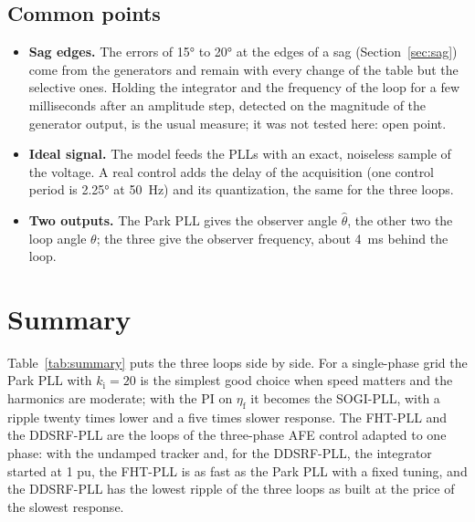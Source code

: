 \documentclass[11pt,a4paper]{scrartcl}
\newcommand{\ped}[1]{_{\mathrm{#1}}}
\begin{document}
\begin{onehalfspace}
\subsection{Common points}
\label{sec:critcommon}

\begin{itemize}[nosep]
	\item \textbf{Sag edges.} The errors of \ang{15} to \ang{20} at the edges of a sag (Section~\ref{sec:sag}) come from the generators and remain with every change of the table but the selective ones. Holding the integrator and the frequency of the loop for a few milliseconds after an amplitude step, detected on the magnitude of the generator output, is the usual measure; it was not tested here: open point.
	\item \textbf{Ideal signal.} The model feeds the PLLs with an exact, noiseless sample of the voltage. A real control adds the delay of the acquisition (one control period is \ang{2.25} at \SI{50}{\hertz}) and its quantization, the same for the three loops.
	\item \textbf{Two outputs.} The Park PLL gives the observer angle $\hat\theta$, the other two the loop angle $\theta$; the three give the observer frequency, about \SI{4}{\milli\second} behind the loop.
\end{itemize}

\section{Summary}
\label{sec:summary}

Table~\ref{tab:summary} puts the three loops side by side. For a single-phase grid the Park PLL with $k\ped{i} = 20$ is the simplest good choice when speed matters and the harmonics are moderate; with the PI on $\eta\ped{f}$ it becomes the SOGI-PLL, with a ripple twenty times lower and a five times slower response. The FHT-PLL and the DDSRF-PLL are the loops of the three-phase AFE control adapted to one phase: with the undamped tracker and, for the DDSRF-PLL, the integrator started at \num{1} pu, the FHT-PLL is as fast as the Park PLL with a fixed tuning, and the DDSRF-PLL has the lowest ripple of the three loops as built at the price of the slowest response.


\end{onehalfspace}
\end{document}
